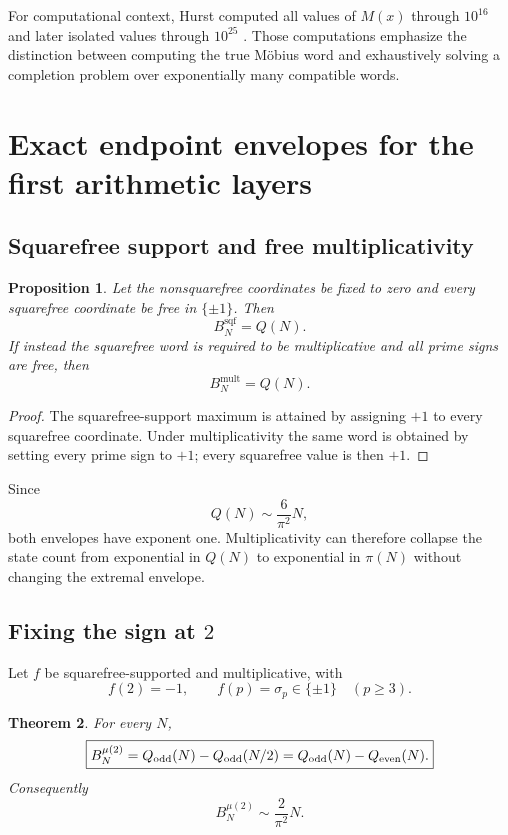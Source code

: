 \documentclass[11pt]{article}
\newtheorem{theorem}{Theorem}[section]
\newtheorem{proposition}[theorem]{Proposition}
\newcommand{\sqf}{\mathrm{sqf}}
\newcommand{\mult}{\mathrm{mult}}
\begin{document}
For computational context, Hurst computed all values of $M(x)$ through $10^{16}$ and later isolated values through $10^{25}$ \cite{Hurst2018,Hurst2026}.  Those computations emphasize the distinction between computing the true M\"obius word and exhaustively solving a completion problem over exponentially many compatible words.

\section{Exact endpoint envelopes for the first arithmetic layers}

\subsection{Squarefree support and free multiplicativity}

\begin{proposition}
Let the nonsquarefree coordinates be fixed to zero and every squarefree coordinate be free in $\{\pm1\}$.  Then
\[
 \boxed{B_N^{\sqf}=Q(N)}.
\]
If instead the squarefree word is required to be multiplicative and all prime signs are free, then
\[
 \boxed{B_N^{\mult}=Q(N)}.
\]
\end{proposition}

\begin{proof}
The squarefree-support maximum is attained by assigning $+1$ to every squarefree coordinate.  Under multiplicativity the same word is obtained by setting every prime sign to $+1$; every squarefree value is then $+1$.
\end{proof}

Since
\[
 Q(N)\sim\frac{6}{\pi^2}N,
\]
both envelopes have exponent one.  Multiplicativity can therefore collapse the state count from exponential in $Q(N)$ to exponential in $\pi(N)$ without changing the extremal envelope.

\subsection{Fixing the sign at $2$}

Let $f$ be squarefree-supported and multiplicative, with
\[
 f(2)=-1,\qquad f(p)=\sigma_p\in\{\pm1\}\quad(p\ge3).
\]

\begin{theorem}
For every $N$,
\[
 \boxed{
 B_N^{\mu(2)}
 =Q_{\rm odd}(N)-Q_{\rm odd}(N/2)
 =Q_{\rm odd}(N)-Q_{\rm even}(N).
 }
\]
Consequently
\[
 \boxed{
 B_N^{\mu(2)}\sim\frac{2}{\pi^2}N.
 }
\]
\end{theorem}
\end{document}
